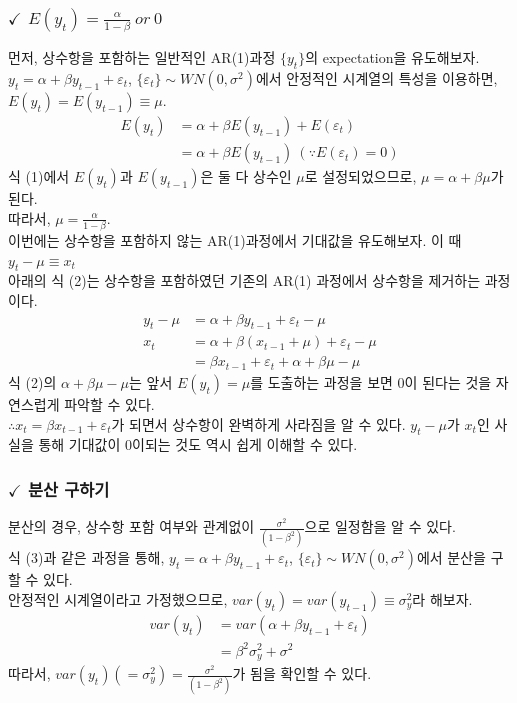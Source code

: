 \documentclass{article}
\begin{document}
\subsubsection*{$\checkmark$ $E(y_t) = \frac{\alpha}{1-\beta} \ or \ 0$ }
먼저, 상수항을 포함하는 일반적인 AR(1)과정 $\{y_t\}$의 expectation을 유도해보자.\\
$y_{t} = \alpha + \beta y_{t-1} + \varepsilon_t$, $\{\varepsilon_t\} \sim WN(0, \sigma^2)$에서 안정적인 시계열의 특성을 이용하면, $E(y_t) = E(y_{t-1})\equiv \mu$. \\
\begin{equation}
\begin{aligned}
E(y_t) &= \alpha + \beta E(y_{t-1}) + E(\varepsilon_t) \\
       &= \alpha + \beta E(y_{t-1}) \ (\because E(\varepsilon_t) = 0)
\end{aligned}
\end{equation}
식 (1)에서 $E(y_{t})$과 $E(y_{t-1})$은 둘 다 상수인 $\mu$로 설정되었으므로, $\mu = \alpha + \beta\mu$가 된다.\\
따라서, $\mu = \frac{\alpha}{1-\beta}$.\\
이번에는 상수항을 포함하지 않는 AR(1)과정에서 기대값을 유도해보자. 이 때 $y_t - \mu \equiv x_t $ \\
아래의 식 (2)는 상수항을 포함하였던 기존의 AR(1) 과정에서 상수항을 제거하는 과정이다.
\begin{equation}
\begin{aligned}
y_t - \mu &= \alpha + \beta y_{t-1} + \varepsilon_t - \mu \\
    x_{t} &= \alpha + \beta(x_{t-1} + \mu) + \varepsilon_t - \mu \\
          &= \beta x_{t-1} + \varepsilon_t + \alpha + \beta\mu - \mu       
\end{aligned}  
\end{equation}
식 (2)의 $\alpha + \beta\mu - \mu$는 앞서 $E(y_t) = \mu$를 도출하는 과정을 보면 0이 된다는 것을 자연스럽게 파악할 수 있다.\\
$\therefore x_t = \beta x_{t-1} + \varepsilon_t$가 되면서 상수항이 완벽하게 사라짐을 알 수 있다. $y_t - \mu$가 $x_t$인 사실을 통해 기대값이 0이되는 것도 역시 쉽게 이해할 수 있다.
\newpage
\subsubsection*{$\checkmark$ 분산 구하기}
분산의 경우, 상수항 포함 여부와 관계없이 $\frac{\sigma^2}{(1-\beta^2)}$으로 일정함을 알 수 있다.\\
식 (3)과 같은 과정을 통해, $y_{t} = \alpha + \beta y_{t-1} + \varepsilon_t$, $\{\varepsilon_t\} \sim WN(0, \sigma^2)$에서 분산을 구할 수 있다.\\
안정적인 시계열이라고 가정했으므로, $var(y_t) = var(y_{t-1}) \equiv \sigma^2_{y}$라 해보자.
\begin{equation}
\begin{aligned}
var(y_t) &= var(\alpha + \beta y_{t-1} + \varepsilon_t)\\
         &= \beta^2 \sigma^2_{y} + \sigma^2           
\end{aligned}  
\end{equation}
따라서, $var(y_t)(= \sigma^2_{y}) = \frac{\sigma^2}{(1-\beta^2)}$가 됨을 확인할 수 있다.
\end{document}
